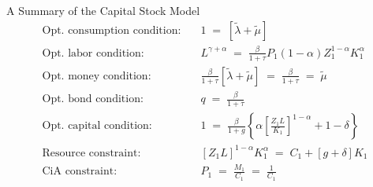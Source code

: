 \documentclass[10pt,c,aspectratio=1610,handout]{beamer}
\begin{document}
\begin{frame}{A Summary of the Capital Stock Model}%
  \begin{align}%
    \text{Opt. consumption condition:} & \quad 1 \; = \; \left[ \tilde{\lambda} + \tilde{\mu} \right]\\%
    \text{Opt. labor condition:} & \quad L^{\gamma +\alpha} \; = \; \frac{\beta}{1+\tau} P_{1} (1-\alpha) Z_{1}^{1-\alpha} K_{1}^{\alpha} \label{BG labor}\\%
    \text{Opt. money condition:} & \quad \frac{\beta}{1+\tau} \left[ \tilde{\lambda}+\tilde{\mu} \right] \; = \; \frac{\beta}{1+\tau} \; = \; \tilde{\mu}\\%
    \text{Opt. bond condition:} & \quad q \; = \; \frac{\beta}{1+\tau}\\%
    \text{Opt. capital condition:} & \quad 1 \; = \; \frac{\beta}{1+g} \left\{ \alpha \left[ \frac{Z_{1}L}{K_{1}} \right]^{1-\alpha} + 1 - \delta \right\} \label{BG capital}\\%
    \text{Resource constraint:} & \quad \left[ Z_{1} L \right]^{1-\alpha} K_{1}^{\alpha} \; = \; C_{1} + \left[ g+\delta \right] K_{1}\\%
    \text{CiA constraint:} & \quad P_{1} \; = \; \frac{M_{1}}{C_{1}} \; = \; \frac{1}{C_1}%
  \end{align}%
\end{frame}
\end{document}
